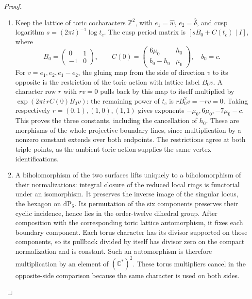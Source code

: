 \begin{proof}
\begin{enumerate}[label=\arabic*.,leftmargin=*]
\item Keep the lattice of toric cocharacters \(\mathbb Z^2\), with
\(e_1=\widehat w\), \(e_2=\widehat\delta\), and cusp logarithm
\(s=(2\pi i)^{-1}\log t_c\). The cusp period matrix is
\([sB_0+C(t_c)\mid I]\), where
\[
 B_0=\begin{pmatrix}0&1\\-1&0\end{pmatrix},\qquad
 C(0)=\begin{pmatrix}6\mu_0&h_0\\b_0-h_0&\mu_0\end{pmatrix},
 \quad b_0=c.
\]
For \(v=e_1,e_2,e_1-e_2\), the gluing map from the side of direction
\(v\) to its opposite is the restriction of the toric action with lattice
label \(B_0v\). A character row \(r\) with \(rv=0\) pulls back by this
map to itself multiplied by
\(\exp(2\pi i\,rC(0)B_0v)\): the remaining power of \(t_c\) is
\(rB_0^2v=-rv=0\). Taking respectively
\(r=(0,1),(1,0),(1,1)\) gives exponents
\(-\mu_0,6\mu_0,-7\mu_0-c\). This proves the three constants, including
the cancellation of \(h_0\). These are morphisms of the whole projective
boundary lines, since multiplication by a nonzero constant extends over
both endpoints. The restrictions agree at both triple points, as the
ambient toric action supplies the same vertex identifications.

\item A biholomorphism of the two surfaces lifts uniquely to a biholomorphism
of their normalizations: integral closure of the reduced local rings is
functorial under an isomorphism. It preserves the inverse image of the
singular locus, the hexagon on \(\mathrm{dP}_6\). Its permutation of the
six components preserves their cyclic incidence, hence lies in the
order-twelve dihedral group. After composition with the corresponding
toric lattice automorphism, it fixes each boundary component. Each torus
character has its divisor supported on those components, so its pullback
divided by itself has divisor zero on the compact normalization and is
constant. Such an automorphism is therefore multiplication by an element
of \((\mathbb C^*)^2\). These torus multipliers cancel in the opposite-side
comparison because the same character is used on both sides.


\end{enumerate}
\end{proof}
